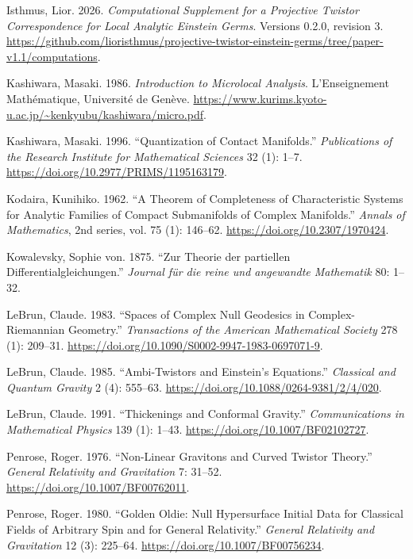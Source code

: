 \documentclass[
  english,
  11pt,
  reqno]{amsart}
\newlength{\cslhangindent}
\newenvironment{CSLReferences}[2] %
 {\begin{list}{}{%
  \setlength{\itemindent}{0pt}
  \setlength{\leftmargin}{0pt}
  \setlength{\parsep}{0pt}
  \ifodd #1
   \setlength{\leftmargin}{\cslhangindent}
   \setlength{\itemindent}{-1\cslhangindent}
  \fi
  \setlength{\itemsep}{#2\baselineskip}}}
 {\end{list}}
\begin{document}
\begin{CSLReferences}{1}{1}
Isthmus, Lior. 2026. \emph{Computational Supplement for a Projective
Twistor Correspondence for Local Analytic Einstein Germs}. Versions
0.2.0, revision 3.
\url{https://github.com/lioristhmus/projective-twistor-einstein-germs/tree/paper-v1.1/computations}.

Kashiwara, Masaki. 1986. \emph{Introduction to Microlocal Analysis}.
L'Enseignement Mathématique, Université de Genève.
\url{https://www.kurims.kyoto-u.ac.jp/~kenkyubu/kashiwara/micro.pdf}.

Kashiwara, Masaki. 1996. {``Quantization of Contact Manifolds.''}
\emph{Publications of the Research Institute for Mathematical Sciences}
32 (1): 1--7. \url{https://doi.org/10.2977/PRIMS/1195163179}.

Kodaira, Kunihiko. 1962. {``A Theorem of Completeness of Characteristic
Systems for Analytic Families of Compact Submanifolds of Complex
Manifolds.''} \emph{Annals of Mathematics}, 2nd series, vol. 75 (1):
146--62. \url{https://doi.org/10.2307/1970424}.

Kowalevsky, Sophie von. 1875. {``{Zur Theorie der partiellen
Differentialgleichungen}.''} \emph{{Journal für die reine und angewandte
Mathematik}} 80: 1--32.

LeBrun, Claude. 1983. {``Spaces of Complex Null Geodesics in
Complex-{Riemannian} Geometry.''} \emph{Transactions of the American
Mathematical Society} 278 (1): 209--31.
\url{https://doi.org/10.1090/S0002-9947-1983-0697071-9}.

LeBrun, Claude. 1985. {``Ambi-Twistors and {Einstein}'s Equations.''}
\emph{Classical and Quantum Gravity} 2 (4): 555--63.
\url{https://doi.org/10.1088/0264-9381/2/4/020}.

LeBrun, Claude. 1991. {``Thickenings and Conformal Gravity.''}
\emph{Communications in Mathematical Physics} 139 (1): 1--43.
\url{https://doi.org/10.1007/BF02102727}.

Penrose, Roger. 1976. {``Non-Linear Gravitons and Curved Twistor
Theory.''} \emph{General Relativity and Gravitation} 7: 31--52.
\url{https://doi.org/10.1007/BF00762011}.

Penrose, Roger. 1980. {``Golden Oldie: Null Hypersurface Initial Data
for Classical Fields of Arbitrary Spin and for General Relativity.''}
\emph{General Relativity and Gravitation} 12 (3): 225--64.
\url{https://doi.org/10.1007/BF00756234}.


\end{CSLReferences}
\end{document}
